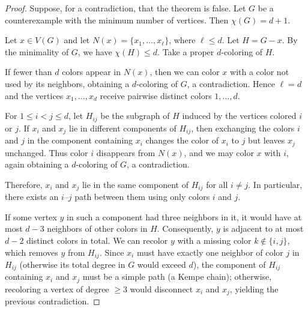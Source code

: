 \documentclass[11pt, a4paper]{ctexrep}
\begin{document}
\begin{proof}
    Suppose, for a contradiction, that the theorem is false.
    Let $G$ be a counterexample with the minimum number of vertices.
    Then $\chi(G) = d+1$.

    Let $x \in V(G)$ and let $N(x) = \{x_1, \dots, x_\ell\}$, where $\ell \le d$.
    Let $H = G - x$. By the minimality of $G$, we have $\chi(H) \le d$.
    Take a proper $d$-coloring of $H$.

    If fewer than $d$ colors appear in $N(x)$, then we can color $x$
    with a color not used by its neighbors, obtaining a $d$-coloring of $G$,
    a contradiction. Hence $\ell = d$ and the vertices $x_1, \dots, x_d$
    receive pairwise distinct colors $1, \dots, d$.

    For $1 \le i < j \le d$, let $H_{ij}$ be the subgraph of $H$
    induced by the vertices colored $i$ or $j$.
    If $x_i$ and $x_j$ lie in different components of $H_{ij}$,
    then exchanging the colors $i$ and $j$ in the component containing $x_i$
    changes the color of $x_i$ to $j$ but leaves $x_j$ unchanged.
    Thus color $i$ disappears from $N(x)$, and we may color $x$ with $i$,
    again obtaining a $d$-coloring of $G$, a contradiction.

    Therefore, $x_i$ and $x_j$ lie in the same component of $H_{ij}$
    for all $i \ne j$. In particular, there exists an $i$--$j$ path between them
    using only colors $i$ and $j$.
    \begin{center}
    \end{center}

    If some vertex $y$ in such a component had three neighbors in it,
    it would have at most $d-3$ neighbors of other colors in $H$.
    Consequently, $y$ is adjacent to at most $d-2$ distinct colors in total.
    We can recolor $y$ with a missing color $k \notin \{i, j\}$, which removes $y$ from $H_{ij}$.
    Since $x_i$ must have exactly one neighbor of color $j$ in $H_{ij}$ (otherwise its total degree in $G$ would exceed $d$),
    the component of $H_{ij}$ containing $x_i$ and $x_j$ must be a simple path (a Kempe chain);
    otherwise, recoloring a vertex of degree $\ge 3$ would disconnect $x_i$ and $x_j$, yielding the previous contradiction.


\end{proof}
\end{document}
